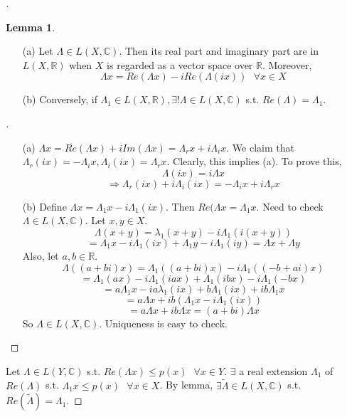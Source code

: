 \documentclass{article}
\newcommand{\sfa}{\text{  } \forall}
\theoremstyle{definition}
\newtheorem{lem}{Lemma}
\newenvironment{proofs}[1][\proofname]{%
  \begin{proof}[#1]$ $\par\nobreak\ignorespaces
}{%
  \end{proof}
}
\begin{document}
\begin{proofs}
		\begin{lem}
			\begin{enumerate}
				\item[(a)] Let $\Lambda \in L(X, \mathbb{C})$. 
					Then its real part and imaginary part are in $L(X, \mathbb{R})$ when $X$ is regarded as a vector space over $\mathbb{R}$.
					Moreover, 
					\[
						\Lambda x = Re(\Lambda x) - i Re(\Lambda(ix)) \sfa x \in X
					\]

				\item[(b)] Conversely, if $\Lambda_1 \in L(X, \mathbb{R}), \exists ! \Lambda \in L(X, \mathbb{C})$ s.t. $Re(\Lambda) = \Lambda_1$.
			\end{enumerate}
		\end{lem}

		\begin{proofs}
			\begin{enumerate}
				\item[(a)] $\Lambda x = Re(\Lambda x) + i Im(\Lambda x)= \Lambda_r x + i \Lambda_i x$.
					We claim that $\Lambda_r(ix) = - \Lambda_i x, \Lambda_i(ix) = \Lambda_r x$.
					Clearly, this implies (a).
					To prove this, 
					\[
						\Lambda(ix) = i \Lambda x
					\]
					\[
						\Rightarrow \Lambda_r(ix) + i \Lambda_i(ix) = -\Lambda_i x + i \Lambda_r x
					\]

				\item[(b)] Define $\Lambda x = \Lambda_1 x - i \Lambda_1 (ix)$.
					Then $Re(\Lambda x = \Lambda_1 x$.
					Need to check $\Lambda \in L(X, \mathbb{C})$. 
					Let $x, y \in X$. 
					\[
						\Lambda(x + y) = \lambda_1(x + y) - i \Lambda_1(i(x + y))
					\]
					\[
						 = \Lambda_1 x - i \Lambda_1(ix) + \Lambda_1 y - i \Lambda_1 (iy) = \Lambda x + \Lambda y
					 \]
					Also, let $a, b \in \mathbb{R}$.
					\[
						\Lambda((a + bi) x) = \Lambda_1((a + bi)x) - i \Lambda_1((-b + ai) x)
					\]
					\[
						= \Lambda_1(ax) - i \Lambda_1(iax) + \Lambda_1(ibx) - i \Lambda_1(-bx)
					\]
					\[
						= a \Lambda_1 x - i a \lambda_1(ix) + b \Lambda_1(ix) + ib \Lambda_1 x
					\]
					\[
						= a \Lambda x + ib(\Lambda_1 x - i \Lambda_1 (ix))
					\]
					\[
						= a \Lambda x + ib \Lambda x = (a + bi) \Lambda x
					\]
					So $\Lambda \in L(X, \mathbb{C})$.
					Uniqueness is easy to check.
					
			\end{enumerate}
		\end{proofs}
		Let $\Lambda \in L(Y, \mathbb{C})$ s.t. $Re(\Lambda x) \leq p(x) \sfa x \in Y$.
		$\exists$ a real extension $\Lambda_1$ of $Re(\Lambda)$ s.t. $\Lambda_1 x \leq p(x) \sfa x \in X$.
		By lemma, $\exists \tilde{\Lambda} \in L(X, \mathbb{C})$ s.t. $Re(\tilde{\Lambda}) = \Lambda_1$.
\end{proofs}
\end{document}
